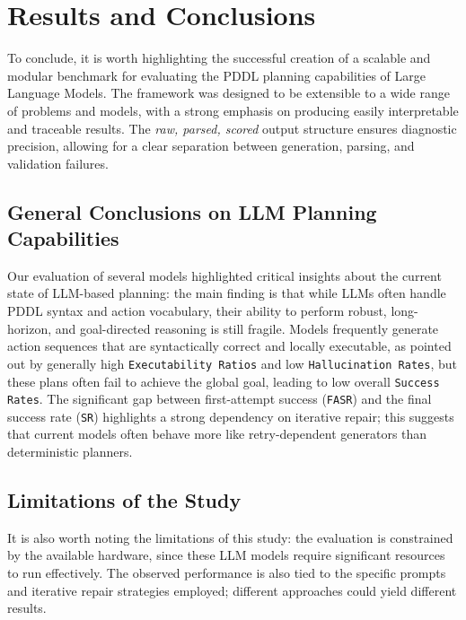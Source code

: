 \section{Results and Conclusions}
To conclude, it is worth highlighting the successful creation of a scalable and modular benchmark for evaluating the PDDL planning capabilities of Large Language Models. The framework was designed to be extensible to a wide range of problems and models, with a strong emphasis on producing easily interpretable and traceable results. The \textit{raw, parsed, scored} output structure ensures diagnostic precision, allowing for a clear separation between generation, parsing, and validation failures.

\subsection{General Conclusions on LLM Planning Capabilities}
Our evaluation of several models highlighted critical insights about the current state of LLM-based planning: the main finding is that while LLMs often handle PDDL syntax and action vocabulary, their ability to perform robust, long-horizon, and goal-directed reasoning is still fragile.
Models frequently generate action sequences that are syntactically correct and locally executable, as pointed out by generally high \texttt{Executability Ratios} and low \texttt{Hallucination Rates}, but these plans often fail to achieve the global goal, leading to low overall \texttt{Success Rates}. The significant gap between first-attempt success (\texttt{FASR}) and the final success rate (\texttt{SR}) highlights a strong dependency on iterative repair; this suggests that current models often behave more like retry-dependent generators than deterministic planners.

\subsection{Limitations of the Study}
It is also worth noting the limitations of this study: the evaluation is constrained by the available hardware, since these LLM models require significant resources to run effectively.
The observed performance is also tied to the specific prompts and iterative repair strategies employed; different approaches could yield different results.

